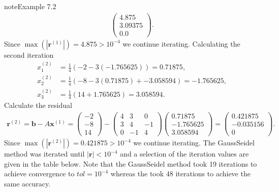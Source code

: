 \documentclass[letterpaper,10pt,english]{jupyterBook}
\begin{document}
\begin{sphinxadmonition}{note}{Example 7.2}
\begin{align*}
    \begin{pmatrix} 4.875 \\ 3.09375 \\ 0.0 \end{pmatrix}.
\end{align*}
\sphinxAtStartPar
Since \(\max(| \mathbf{r}^{(1)} |) = 4.875 > 10^{-4}\) we continue iterating. Calculating the second iteration
\begin{align*}
    x_{1}^{(2)} &= \frac{1}{4} \left( -2 - 3 (-1.765625) \right) = 0.71875, \\
    x_{2}^{(2)} &= \frac{1}{4} \left( -8 - 3 (0.71875) + -3.058594 \right) = -1.765625, \\
    x_{3}^{(2)} &= \frac{1}{4} \left( 14 + 1.765625 \right) = 3.058594.
\end{align*}
\sphinxAtStartPar
Calculate the residual
\begin{align*}
    \mathbf{r}^{(2)} = \mathbf{b} - A \mathbf{x}^{(1)} = 
    \begin{pmatrix} -2 \\ -8 \\ 14 \end{pmatrix} -
    \begin{pmatrix} 4 & 3 & 0 \\ 3 & 4 & -1 \\ 0 & -1 & 4 \end{pmatrix}
    \begin{pmatrix} 0.71875 \\ -1.765625 \\ 3.058594 \end{pmatrix} =
    \begin{pmatrix} 0.421875 \\ -0.035156 \\ 0 \end{pmatrix}.
\end{align*}
\sphinxAtStartPar
Since \(\max(| \mathbf{r}^{(2)} |) = 0.421875 > 10^{-4}\) we continue iterating. The Gauss\sphinxhyphen{}Seidel method was iterated until \(|\mathbf{r}| < 10^{-4}\) and a selection of the iteration values are given in the table below. Note that the Gauss\sphinxhyphen{}Seidel method took 19 iterations to achieve convergence to \(tol=10^{-4}\) whereas the {\hyperref[\detokenize{7_Indirect_methods/7.1_Jacobi_method:jacobi-method-example}]{}} took 48 iterations to achieve the same accuracy.



\end{sphinxadmonition}
\end{document}
